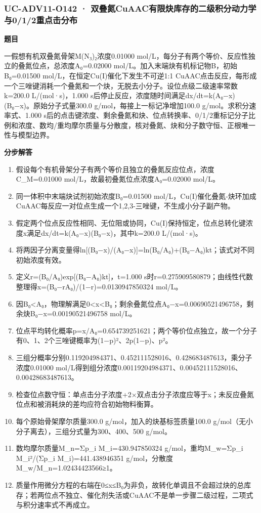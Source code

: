 \documentclass[UTF8,11pt,a4paper]{ctexart}
\begin{document}
\subsubsection*{UC-ADV11-O142 · 双叠氮CuAAC有限炔库存的二级积分动力学与0/1/2重点击分布}
\noindent\textbf{题目}\par
一假想有机双叠氮骨架M(N₃)₂浓度0.01000 mol/L，每分子有两个等价、反应性独立的叠氮位点，总浓度A₀=0.02000 mol/L。加入末端炔有机标记物B，初始B₀=0.01500 mol/L，在恒定Cu(I)催化下发生不可逆1:1 CuAAC点击反应，每形成一个三唑键消耗一个叠氮和一个炔，无脱去小分子。设位点级二级速率常数k=200.0 L/(mol·s)，1.000 s后停止反应，浓度随时间满足dx/dt=k(A₀−x)(B₀−x)。原始分子式量300.0 g/mol，每接上一标记净增加100.0 g/mol。求积分速率式、1.000 s后的点击键浓度、剩余叠氮和炔、位点转换率、0/1/2重标记分子比例和浓度、数均/重均摩尔质量与分散度，核对叠氮、炔和分子数守恒、正根唯一性与模型边界。\par
\medskip\noindent\textbf{分步解答}
\begin{enumerate}
\item 假设每个有机骨架分子有两个等价且独立的叠氮反应位点，浓度C\_M=0.01000 mol/L，故最初叠氮位点浓度A₀=0.02000 mol/L。
\item 同一体积中末端炔试剂初始浓度B₀=0.01500 mol/L，Cu(I)催化叠氮-炔环加成CuAAC每反应一对位点生成一个1,2,3-三唑键，不生成小分子副产物。
\item 假定两个位点反应性相同、无位阻或协同，Cu(I)保持恒定，位点总转化键浓度x满足dx/dt=k(A₀−x)(B₀−x)，其中k=200.0 L/(mol·s)。
\item 将两因子分离变量得ln[(B₀−x)/(A₀−x)]=ln(B₀/A₀)+(B₀−A₀)kt；该式对不同初始浓度有效。
\item 定义r=(B₀/A₀)exp[(B₀−A₀)kt]，t=1.000 s时r=0.275909580879；由线性代数整理得x=(B₀−rA₀)/(1−r)=0.0130947850324 mol/L。
\item 因B₀<A₀，物理解满足0<x<B₀；剩余叠氮位点A₀−x=0.00690521496758，剩余炔B₀−x=0.00190521496758 mol/L。
\item 位点平均转化概率p=x/A₀=0.654739251621；两个等价位点独立，故一个分子有0、1、2个三唑键概率为(1−p)²、2p(1−p)、p²。
\item 三组分概率分别0.119204984371、0.452111528016、0.428683487613，乘分子浓度0.01000 mol/L得到组分浓度0.00119204984371、0.00452111528016、0.00428683487613。
\item 检查位点数守恒：单点击分子浓度+2×双点击分子浓度应等于x；未反应叠氮位点和被消耗炔的差均应符合初始物料衡算。
\item 每个原始骨架摩尔质量300.0 g/mol，加入的炔基标签质量100.0 g/mol（无小分子离去），三组分式量为300、400、500 g/mol。
\item 数均摩尔质量M\_n=Σp\_i M\_i=430.947850324 g/mol，重均M\_w=Σp\_i M\_i²/(Σp\_i M\_i)=441.438946351 g/mol，分散度M\_w/M\_n=1.02434423566≥1。
\item 质量作用微分方程的右端在0≤x≤B₀为非负，故转化单调且不会超过炔的总库存；若两位点不独立、催化剂失活或CuAAC不是单一步骤二级过程，二项式与积分速率式不再成立。
\end{enumerate}
\end{document}
